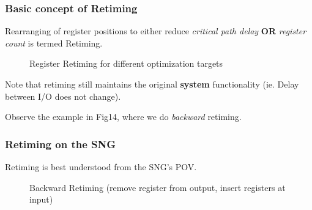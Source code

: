 \documentclass{article}
\begin{document}
\subsubsection{Basic concept of Retiming}
Rearranging of register positions to either reduce \textit{critical path delay} \textbf{OR} \textit{register count} is termed Retiming.

\begin{figure}[htp]%
    \centering
    \qquad
    \caption{Register Retiming for different optimization targets}%
\end{figure}

Note that retiming still maintains the original \textbf{system} functionality (ie. Delay between I/O does not change).

Observe the example in Fig14, where we do \textit{backward} retiming.

\newpage
\subsubsection{Retiming on the SNG}
Retiming is best understood from the SNG's POV.
\begin{figure}[htp]%
    \centering
    \qquad
    \caption{Backward Retiming (remove register from output, insert registers at input)}%
\end{figure}
\end{document}
